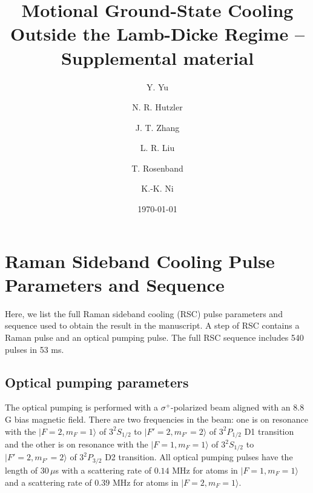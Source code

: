 \documentclass[aps,secnumarabic,amsmath,amssymb]{revtex4}
\begin{document}
\title{Motional Ground-State Cooling Outside the Lamb-Dicke Regime -- Supplemental material}
\author{Y. Yu}
\author{N. R. Hutzler}
\author{J. T. Zhang}
\author{L. R. Liu}
\author{T. Rosenband}
\author{K.-K. Ni}

\date{\today}

\maketitle

\section{Raman Sideband Cooling Pulse Parameters and Sequence}
Here, we list the full Raman sideband cooling (RSC) pulse parameters and sequence used to obtain the result in the manuscript.
A step of RSC contains a Raman pulse and an optical pumping pulse.
The full RSC sequence includes 540 pulses in 53 ms.

\subsection{Optical pumping parameters}
The optical pumping is performed with a $\sigma^+$-polarized beam aligned with an 8.8 G bias magnetic field.
There are two frequencies in the beam: one is on resonance with
the $|F=2,m_F=1\rangle$ of $3^2S_{1/2}$ to $|F'=2,m_{F'}=2\rangle$ of $3^2P_{1/2}$ D1 transition
and the other is on resonance with the $|F=1,m_F=1\rangle$ of $3^2S_{1/2}$ to $|F'=2,m_{F'}=2\rangle$ of $3^2P_{3/2}$ D2 transition.
All optical pumping pulses have the length of $30\,\mu$s
with a scattering rate of $0.14$ MHz for atoms in $|F=1,m_F=1\rangle$
and a scattering rate of $0.39$ MHz for atoms in $|F=2,m_F=1\rangle$.
\end{document}
